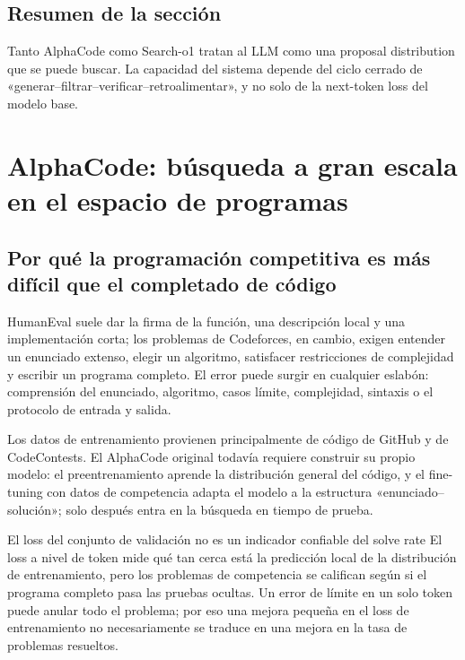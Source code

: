 \documentclass[a4paper]{article}
\begin{document}
\subsection{Resumen de la sección}

Tanto AlphaCode como Search-o1 tratan al LLM como una proposal distribution que se puede buscar. La capacidad del sistema depende del ciclo cerrado de «generar–filtrar–verificar–retroalimentar», y no solo de la next-token loss del modelo base.

\section{AlphaCode: búsqueda a gran escala en el espacio de programas}

\subsection{Por qué la programación competitiva es más difícil que el completado de código}

HumanEval suele dar la firma de la función, una descripción local y una implementación corta; los problemas de Codeforces, en cambio, exigen entender un enunciado extenso, elegir un algoritmo, satisfacer restricciones de complejidad y escribir un programa completo. El error puede surgir en cualquier eslabón: comprensión del enunciado, algoritmo, casos límite, complejidad, sintaxis o el protocolo de entrada y salida.


Los datos de entrenamiento provienen principalmente de código de GitHub y de CodeContests. El AlphaCode original todavía requiere construir su propio modelo: el preentrenamiento aprende la distribución general del código, y el fine-tuning con datos de competencia adapta el modelo a la estructura «enunciado--solución»; solo después entra en la búsqueda en tiempo de prueba.

\begin{warningbox}{El loss del conjunto de validación no es un indicador confiable del solve rate}
El loss a nivel de token mide qué tan cerca está la predicción local de la distribución de entrenamiento, pero los problemas de competencia se califican según si el programa completo pasa las pruebas ocultas. Un error de límite en un solo token puede anular todo el problema; por eso una mejora pequeña en el loss de entrenamiento no necesariamente se traduce en una mejora en la tasa de problemas resueltos.
\end{warningbox}
\end{document}
